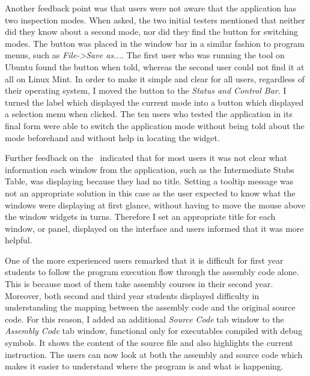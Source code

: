 Another feedback point was that users were not aware that the application has two inspection modes. When asked, the two initial testers mentioned that neither did they know about a second mode, nor did they find the button for switching modes. The button was placed in the window bar in a similar fashion to program menus, such as \textit{File->Save as...}. The first user who was running the tool on Ubuntu found the button when told, whereas the second user could not find it at all on Linux Mint. In order to make it simple and clear for all users, regardless of their operating system, I moved the button to the \textit{Status and Control Bar}.  I turned the label which displayed the current mode into a button which displayed a selection menu when clicked. The ten users who tested the application in its final form were able to switch the application mode without being told about the mode beforehand and without help in locating the widget.

Further feedback on the \gui\ indicated that for most users it was not clear what information each window from the application, such as the Intermediate Stubs Table, was displaying because they had no title. Setting a tooltip message was not an appropriate solution in this case as the user expected to know what the windows were displaying at first glance, without having to move the mouse above the window widgets in turns. Therefore I set an appropriate title for each window, or panel, displayed on the interface and users informed that it was more helpful.

One of the more experienced users remarked that it is difficult for first year students to follow the program execution flow through the assembly code alone. This is because most of them take assembly courses in their second year. Moreover, both second and third year students displayed difficulty in understanding the mapping between the assembly code and the original source code. For this reason, I added an additional \textit{Source Code} tab window to the \textit{Assembly Code} tab window, functional only for executables compiled with debug symbols. It shows the content of the source file and also highlights the current instruction. The users can now look at both the assembly and source code which makes it easier to understand where the program is and what is happening.

